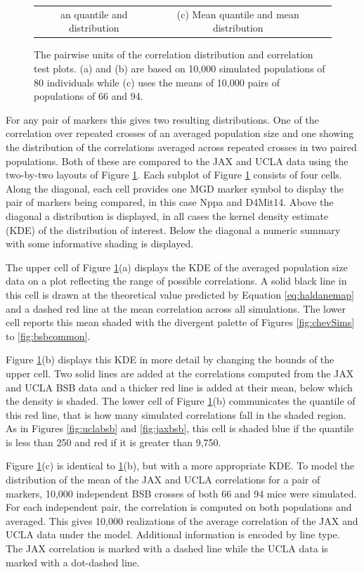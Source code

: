 \documentclass[12pt]{article}
\begin{document}
\begin{figure}[h]
\begin{center}
\begin{tabular}{ccc}
an quantile and distribution} & {\footnotesize (c) Mean quantile and mean distribution}
    \end{tabular}
  \end{center}
  \caption{The pairwise units of the correlation distribution and correlation test plots. (a) and (b) are based on 10,000 simulated populations of 80 individuals while (c) uses the means of 10,000 pairs of populations of 66 and 94.}
  \label{fig:2by2}
\end{figure}

For any pair of markers this gives two resulting distributions. One of the correlation over repeated crosses of an averaged population size and one showing the distribution of the correlations averaged across repeated crosses in two paired populations. Both of these are compared to the JAX and UCLA data using the two-by-two layouts of Figure \ref{fig:2by2}.
Each subplot of Figure \ref{fig:2by2} consists of four cells. Along the diagonal, each cell provides one MGD marker symbol to display the pair of markers being compared, in this case Nppa and D4Mit14. Above the diagonal a distribution is displayed, in all cases the kernel density estimate (KDE) of the distribution of interest. Below the diagonal a numeric summary with some informative shading is displayed.

The upper cell of Figure \ref{fig:2by2}(a) displays the KDE of the averaged population size data on a plot reflecting the range of possible correlations. A solid black line in this cell is drawn at the theoretical value predicted by Equation \ref{eq:haldanemap} and a dashed red line at the mean correlation across all simulations. The lower cell reports this mean shaded with the divergent palette of Figures \ref{fig:chevSims} to \ref{fig:bsbcommon}.

Figure \ref{fig:2by2}(b) displays this KDE in more detail by changing the bounds of the upper cell. Two solid lines are added at the correlations computed from the JAX and UCLA BSB data and a thicker red line is added at their mean, below which the density is shaded. The lower cell of Figure \ref{fig:2by2}(b) communicates the quantile of this red line, that is how many simulated correlations fall in the shaded region. As in Figures \ref{fig:uclabsb} and \ref{fig:jaxbsb}, this cell is shaded blue if the quantile is less than 250 and red if it is greater than 9,750.

Figure \ref{fig:2by2}(c) is identical to \ref{fig:2by2}(b), but with a more appropriate KDE. To model the distribution of the mean of the JAX and UCLA correlations for a pair of markers, 10,000 independent BSB crosses of both 66 and 94 mice were simulated. For each independent pair, the correlation is computed on both populations and averaged. This gives 10,000 realizations of the average correlation of the JAX and UCLA data under the model. Additional information is encoded by line type. The JAX correlation is marked with a dashed line while the UCLA data is marked with a dot-dashed line.
\end{document}
